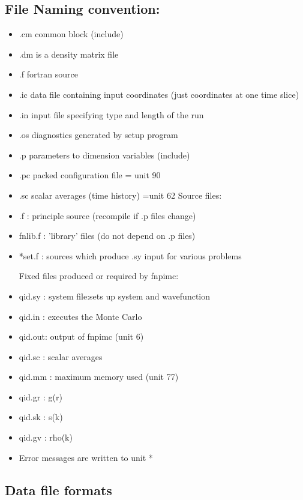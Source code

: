 \subsection{ File Naming convention: } 
\begin{itemize}
\item
    .cm  common block (include)
\item
    .dm  is a density matrix file
\item
    .f   fortran source
\item
    .ic  data file containing input coordinates
         (just coordinates at one time slice)
\item
    .in  input file specifying type and length of the run
\item
    .os  diagnostics generated by setup program
\item
    .p   parameters to dimension variables (include)
\item
    .pc packed configuration file = unit 90
\item
    .sc  scalar averages (time history) =unit 62
Source files:
\item
    .f : principle source (recompile if .p files change)
\item
    fnlib.f : 'library' files (do not depend on .p files)
\item
    *set.f  : sources which produce .sy input for various problems
 
Fixed files produced or required by fnpimc:
 
\item
    qid.sy : system file:sets up system and wavefunction
\item
    qid.in : executes the Monte Carlo
\item
    qid.out: output of fnpimc (unit 6)
\item
    qid.sc : scalar averages
\item
    qid.mm : maximum memory used (unit 77)
\item
    qid.gr : g(r)
\item
    qid.sk : s(k)
\item
    qid.gv : rho(k)
\item
    Error messages are written to unit *
\end{itemize}
 

 
\subsection{Data file formats}

